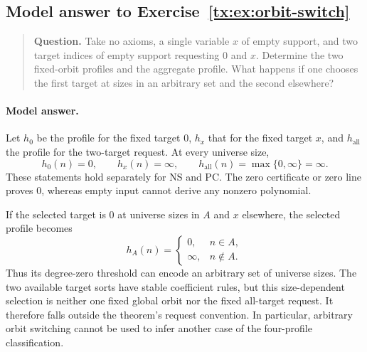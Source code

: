 \documentclass[11pt,a4paper,oneside,openany]{book}
\theoremstyle{definition}\newtheorem{definition}[theorem]{Definition}
\theoremstyle{remark}\newtheorem{remark}[theorem]{Remark}
\numberwithin{equation}{chapter}
\begin{document}
\par


\begin{samepage}

\subsection*{Model answer to Exercise~\ref{tx:ex:orbit-switch}}\label{tx:ans:orbit-switch}

\begin{quote}\small\textbf{Question.} Take no axioms, a single variable $x$ of empty support, and two target
indices of empty support requesting $0$ and $x$. Determine the two
fixed-orbit profiles and the aggregate profile. What happens if one
chooses the first target at sizes in an arbitrary set and the second
elsewhere?
\end{quote}

\paragraph{Model answer.}
Let \(h_0\) be the profile for the fixed target \(0\), \(h_x\) that
for the fixed target \(x\), and \(h_{\mathrm{all}}\) the profile for
the two-target request. At every universe size,
\[
            h_0(n)=0,\qquad h_x(n)=\infty,\qquad
            h_{\mathrm{all}}(n)=\max\{0,\infty\}=\infty.
\]
These statements hold separately for NS and PC. The zero certificate
or zero line proves \(0\), whereas empty input cannot derive any
nonzero polynomial.
\end{samepage}

If the selected target is \(0\) at universe sizes in \(A\) and \(x\) elsewhere,
the selected profile becomes
\[
 h_A(n)=
 \begin{cases}0,&n\in A,\\ \infty,&n\notin A.\end{cases}
\]
Thus its degree-zero threshold can encode an arbitrary set of universe sizes.
The two available target sorts have stable coefficient rules, but
this size-dependent selection is neither one fixed global orbit nor
the fixed all-target request. It therefore falls outside the theorem's
request convention. In particular, arbitrary orbit switching cannot
be used to infer another case of the four-profile classification.


\par
\end{document}
